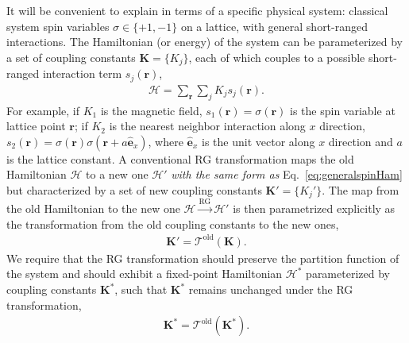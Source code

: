 \documentclass[aps,prr,reprint,superscriptaddress,floatfix]{revtex4-2}
\begin{document}
It will be convenient to explain in terms of a specific physical system: classical system spin variables $\sigma \in \{+1, -1\}$ on a lattice, with general short-ranged interactions.
The Hamiltonian (or energy) of the system can be parameterized by a set of coupling constants $\mathbf{K} = \{K_j\}$, each of which couples to a possible short-ranged interaction term $s_j(\mathbf{r})$,
%
\begin{align}\label{eq:generalspinHam}
    \mathcal{H} = \sum_{\mathbf{r}} \sum_{j} K_j s_j(\mathbf{r}).
\end{align}
%
For example, if $K_1$ is the magnetic field, $s_1(\mathbf{r}) = \sigma(\mathbf{r})$ is the spin variable at lattice point $\mathbf{r}$; if $K_2$ is the nearest neighbor interaction along $x$ direction, $s_2(\mathbf{r}) = \sigma(\mathbf{r})\sigma(\mathbf{r} + a\hat{\mathbf{e}}_x)$, where $\hat{\mathbf{e}}_x$ is the unit vector along $x$ direction and $a$ is the lattice constant. 
A conventional RG transformation maps the old Hamiltonian $\mathcal{H}$ to a new one $\mathcal{H}'$ \textit{with the same form as} Eq.~\eqref{eq:generalspinHam} but characterized by a set of new coupling constants $\mathbf{K}' = \{ K_j'\}$. 
The map from the old Hamiltonian to the new one $\mathcal{H} \xrightarrow{\text{RG}} \mathcal{H}'$ is then parametrized explicitly as the transformation from the old coupling constants to the new ones,
%
\begin{align}\label{eq:oldRGK}
    \mathbf{K}' = \mathcal{T}^{\text{old}}\left(\mathbf{K}\right).
\end{align}
%
We require that the RG transformation should preserve the partition function of the system and should exhibit a fixed-point Hamiltonian $\mathcal{H}^{*}$ parameterized by coupling constants $\mathbf{K}^{*}$, such that $\mathbf{K}^{*}$ remains unchanged under the RG transformation,
%
\begin{align}\label{eq:oldRGKstar}
    \mathbf{K}^{*} =
    \mathcal{T}^{\text{old}}\left(\mathbf{K}^{*}\right).
\end{align}
%
\end{document}
